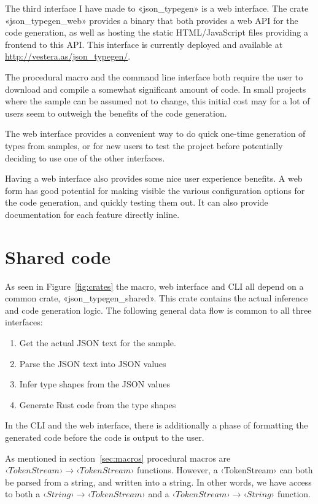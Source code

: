 The third interface I have made to «json_typegen» is a web interface. The crate «json_typegen_web» provides a binary that both provides a web API for the code generation, as well as hosting the static HTML/JavaScript files providing a frontend to this API. This interface is currently deployed and available at \url{http://vestera.as/json_typegen/}.

The procedural macro and the command line interface both require the user to download and compile a somewhat significant amount of code. In small projects where the sample can be assumed not to change, this initial cost may for a lot of users seem to outweigh the benefits of the code generation.

The web interface provides a convenient way to do quick one-time generation of types from samples, or for new users to test the project before potentially deciding to use one of the other interfaces.

Having a web interface also provides some nice user experience benefits. A web form has good potential for making visible the various configuration options for the code generation, and quickly testing them out. It can also provide documentation for each feature directly inline.

\section{Shared code}
\label{sec:shared-code}

As seen in Figure~\ref{fig:crates} the macro, web interface and CLI all depend on a common crate, «json_typegen_shared». This crate contains the actual inference and code generation logic. The following general data flow is common to all three interfaces:

\begin{enumerate}
  \item Get the actual JSON text for the sample.
  \item Parse the JSON text into JSON values
  \item Infer type shapes from the JSON values
  \item Generate Rust code from the type shapes
\end{enumerate}

In the CLI and the web interface, there is additionally a phase of formatting the generated code before the code is output to the user.

As mentioned in section~\ref{sec:macros} procedural macros are $ ‹TokenStream› \rightarrow ‹TokenStream› $ functions. However, a ‹TokenStream› can both be parsed from a string, and written into a string. In other words, we have access to both a $ ‹String› \rightarrow ‹TokenStream› $ and a $ ‹TokenStream› \rightarrow ‹String› $ function.

